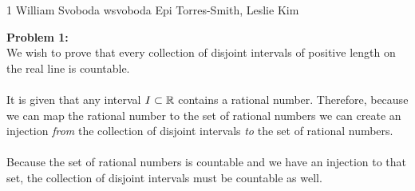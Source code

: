 \documentclass[12pt,letterpaper]{cos340hw}
\begin{document}
           {1}            %
           {William Svoboda}  %
           {wsvoboda}   %
           {Epi Torres-Smith, Leslie Kim} 




\noindent\textbf{Problem 1:}\\
We wish to prove that every collection of disjoint intervals of positive length on the real line is countable.\\\\
It is given that any interval $I \subset {\ensuremath{{\mathbb R}}}$ contains a rational number. Therefore, because we can map the 
rational number to the set of rational numbers we can create an injection \emph{from} the collection of 
disjoint intervals \emph{to} the set of rational numbers.\\\\
Because the set of rational numbers is countable and we have an injection to that set, the collection of 
disjoint intervals must be countable as well.


\end{document}
